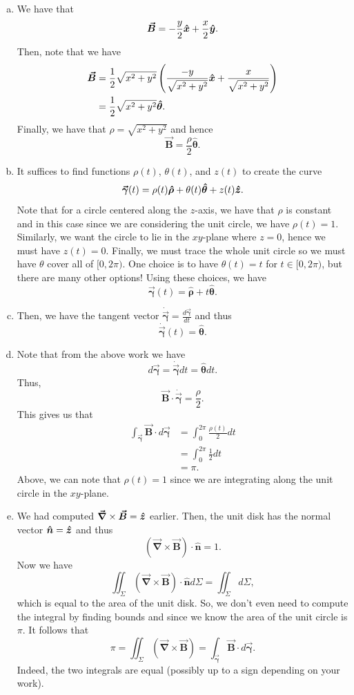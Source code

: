 \documentclass[12pt]{article} %
\newcommand{\grad}{\boldsymbol{\vec{\nabla}}}
\newcommand{\curvegamma}{\boldsymbol{\vec{\gamma}}}
\newcommand{\tangentgamma}{\boldsymbol{\dot{\vec{\gamma}}}}
\newcommand{\thetahat}{\boldsymbol{\hat{\theta}}}
\newcommand{\rhohat}{\boldsymbol{\hat{\rho}}}
\newcommand{\unitvec}{\boldsymbol{\hat{n}}}
\newcommand{\vecfieldB}{\boldsymbol{\vec{B}}}
\begin{document}
\begin{solution}~
\begin{enumerate}[(a)]
    \item We have that
    \[
    \vecfieldB = -\frac{y}{2} \xhat + \frac{x}{2}\yhat.
    \]
    Then, note that we have
    \begin{align*}
        \vecfieldB &= \frac{1}{2}\sqrt{x^2+y^2} \left( \frac{-y}{\sqrt{x^2+y^2}} \xhat + \frac{x}{\sqrt{x^2+y^2}} \right)\\
        &=\frac{1}{2} \sqrt{x^2+y^2} \thetahat.
    \end{align*}
    Finally, we have that $\rho = \sqrt{x^2+y^2}$ and hence
    \[
    \vecfieldB = \frac{\rho}{2} \thetahat.
    \]
    \item It suffices to find functions $\rho(t)$, $\theta(t)$, and $z(t)$ to create the curve
    \[
    \curvegamma(t) = \rho(t) \rhohat + \theta(t) \thetahat + z(t) \zhat.
    \]
    Note that for a circle centered along the $z$-axis, we have that $\rho$ is constant and in this case since we are considering the unit circle, we have $\rho(t)=1$.  Similarly, we want the circle to lie in the $xy$-plane where $z=0$, hence we must have $z(t)=0$.  Finally, we must trace the whole unit circle so we must have $\theta$ cover all of $[0,2\pi)$. One choice is to have $\theta(t)=t$ for $t\in[0,2\pi)$, but there are many other options! Using these choices, we have
    \[
    \curvegamma(t) = \rhohat + t \thetahat.
    \]
    \item Then, we have the tangent vector $\tangentgamma = \frac{d\curvegamma}{dt}$ and thus
    \[
    \tangentgamma(t) = \thetahat.
    \]
    \item Note that from the above work we have
    \[
    d \curvegamma = \tangentgamma dt = \thetahat dt.
    \]
    Thus, 
    \[
    \vecfieldB \cdot \tangentgamma = \frac{\rho}{2}.
    \]
    This gives us that
    \begin{align*}
        \int_{\curvegamma} \vecfieldB \cdot d\curvegamma &= \int_0^{2\pi} \frac{\rho(t)}{2}dt\\
        &=\int_0^{2\pi} \frac{1}{2} dt\\
        &= \pi.
    \end{align*}
    Above, we can note that $\rho(t)=1$ since we are integrating along the unit circle in the $xy$-plane.
    \item We had computed $\grad \times \vecfieldB = \zhat$ earlier.  Then, the unit disk has the normal vector $\unitvec=\zhat$ and thus
    \[
    \left( \grad \times \vecfieldB \right) \cdot \unitvec = 1.
    \]
    Now we have
    \[
    \iint_{\Sigma} \left( \grad \times \vecfieldB \right) \cdot \unitvec d\Sigma = \iint_{\Sigma} d\Sigma,
    \]
    which is equal to the area of the unit disk.  So, we don't even need to compute the integral by finding bounds and since we know the area of the unit circle is $\pi$.  It follows that
    \[
    \pi = \iint_{\Sigma} \left( \grad \times \vecfieldB \right) = \int_{\curvegamma} \vecfieldB \cdot d\curvegamma.
    \]
    Indeed, the two integrals are equal (possibly up to a sign depending on your work). 
\end{enumerate}
\end{solution}
\end{document}
